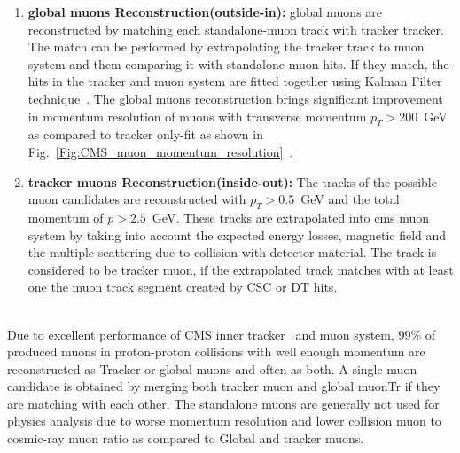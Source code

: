 \begin{enumerate}
 \item \textbf{global muons Reconstruction(outside-in):} global muons are reconstructed by matching each standalone-muon track with tracker tracker. The 
 match can be performed by extrapolating the tracker track to muon system and them comparing it with standalone-muon hits. If they match,  the hits in 
 the tracker and muon system are fitted together using Kalman Filter technique~\cite{cms:38b}. The global muons reconstruction brings significant improvement
 in momentum resolution of muons with transverse momentum $p_T > 200$~GeV as compared to tracker only-fit as shown in
 Fig.~\ref{Fig:CMS_muon_momentum_resolution}~\cite{cms:muonsystem_TDR_2,cms:38c}.
 \item \textbf{tracker muons Reconstruction(inside-out):} The tracks of the possible muon candidates are reconstructed with $p_T > 0.5$~GeV and the total 
 momentum of $p > 2.5$~GeV. These tracks are extrapolated into cms muon system by taking into account the expected energy losses, magnetic field and 
 the multiple scattering due to collision with detector material. The track is considered to be tracker muon, if the extrapolated track matches with 
 at least one the muon track segment created by CSC or DT hits. 
 \end{enumerate}
\\ Due to excellent performance of CMS inner tracker~\cite{cms:38d} and muon system, 99\% of produced muons in proton-proton collisions with well enough momentum  are 
   reconstructed as Tracker or global muons and often as both. A single muon candidate is obtained by merging both tracker muon and global muonTr if they are
   matching with each other. The standalone muons are generally not used for physics analysis due to worse momentum resolution and  lower collision
   muon to cosmic-ray muon ratio as compared to Global and tracker muons. 
